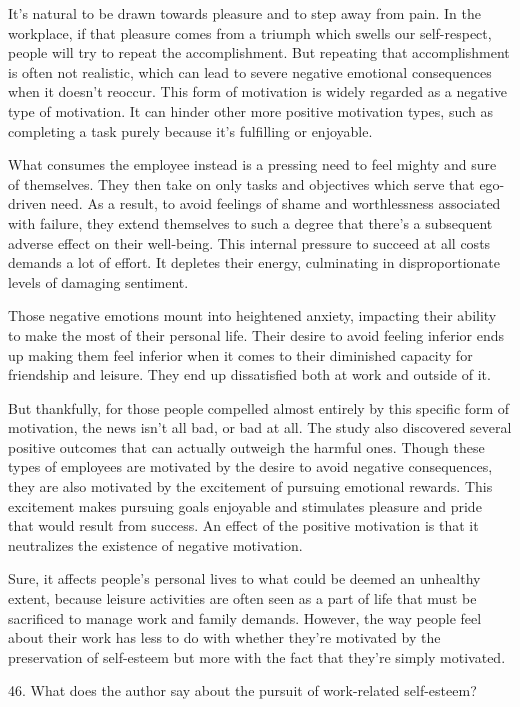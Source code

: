 \documentclass[UTF8,11pt]{ctexart}
\begin{document}
It’s natural to be drawn towards pleasure and to step away from pain. In the workplace, if that pleasure comes from a triumph which swells our self-respect, people will try to repeat the accomplishment. But repeating that accomplishment is often not realistic, which can lead to severe negative emotional consequences when it doesn’t reoccur. This form of motivation is widely regarded as a negative type of motivation. It can hinder other more positive motivation types, such as completing a task purely because it’s fulfilling or enjoyable.


What consumes the employee instead is a pressing need to feel mighty and sure of themselves. They then take on only tasks and objectives which serve that ego-driven need. As a result, to avoid feelings of shame and worthlessness associated with failure, they extend themselves to such a degree that there’s a subsequent adverse effect on their well-being. This internal pressure to succeed at all costs demands a lot of effort. It depletes their energy, culminating in disproportionate levels of damaging sentiment.


Those negative emotions mount into heightened anxiety, impacting their ability to make the most of their personal life. Their desire to avoid feeling inferior ends up making them feel inferior when it comes to their diminished capacity for friendship and leisure. They end up dissatisfied both at work and outside of it.


But thankfully, for those people compelled almost entirely by this specific form of motivation, the news isn’t all bad, or bad at all. The study also discovered several positive outcomes that can actually outweigh the harmful ones. Though these types of employees are motivated by the desire to avoid negative consequences, they are also motivated by the excitement of pursuing emotional rewards. This excitement makes pursuing goals enjoyable and stimulates pleasure and pride that would result from success. An effect of the positive motivation is that it neutralizes the existence of negative motivation.


Sure, it affects people’s personal lives to what could be deemed an unhealthy extent, because leisure activities are often seen as a part of life that must be sacrificed to manage work and family demands. However, the way people feel about their work has less to do with whether they’re motivated by the preservation of self-esteem but more with the fact that they’re simply motivated.


46. What does the author say about the pursuit of work-related self-esteem?
\end{document}
